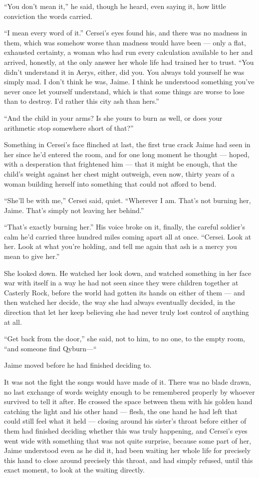 “You don’t mean it,” he said, though he heard, even saying it, how little conviction the words carried.

“I mean every word of it.” Cersei’s eyes found his, and there was no madness in them, which was somehow worse than madness would have been — only a flat, exhausted certainty, a woman who had run every calculation available to her and arrived, honestly, at the only answer her whole life had trained her to trust. “You didn’t understand it in Aerys, either, did you. You always told yourself he was simply mad. I don’t think he was, Jaime. I think he understood something you’ve never once let yourself understand, which is that some things are worse to lose than to destroy. I’d rather this city ash than hers.”

“And the child in your arms? Is she yours to burn as well, or does your arithmetic stop somewhere short of that?”

Something in Cersei’s face flinched at last, the first true crack Jaime had seen in her since he’d entered the room, and for one long moment he thought — hoped, with a desperation that frightened him — that it might be enough, that the child’s weight against her chest might outweigh, even now, thirty years of a woman building herself into something that could not afford to bend.

“She’ll be with me,” Cersei said, quiet. “Wherever I am. That’s not burning her, Jaime. That’s simply not leaving her behind.”

“That’s exactly burning her.” His voice broke on it, finally, the careful soldier’s calm he’d carried three hundred miles coming apart all at once. “Cersei. Look at her. Look at what you’re holding, and tell me again that ash is a mercy you mean to give her.”

She looked down. He watched her look down, and watched something in her face war with itself in a way he had not seen since they were children together at Casterly Rock, before the world had gotten its hands on either of them — and then watched her decide, the way she had always eventually decided, in the direction that let her keep believing she had never truly lost control of anything at all.

“Get back from the door,” she said, not to him, to no one, to the empty room, “and someone find Qyburn—“

Jaime moved before he had finished deciding to.

\sceneBreak

It was not the fight the songs would have made of it. There was no blade drawn, no last exchange of words weighty enough to be remembered properly by whoever survived to tell it after. He crossed the space between them with his golden hand catching the light and his other hand — flesh, the one hand he had left that could still feel what it held — closing around his sister’s throat before either of them had finished deciding whether this was truly happening, and Cersei’s eyes went wide with something that was not quite surprise, because some part of her, Jaime understood even as he did it, had been waiting her whole life for precisely this hand to close around precisely this throat, and had simply refused, until this exact moment, to look at the waiting directly.

